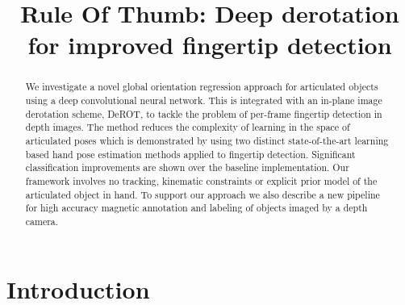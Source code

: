 \documentclass{bmvc2k}
\title{Rule Of Thumb: Deep derotation for improved fingertip detection}
\begin{document}
\maketitle


\begin{abstract}
We investigate a novel global orientation regression approach for articulated 
 objects using a deep convolutional neural network. This is integrated with an in-plane image derotation scheme, DeROT, to tackle the problem of per-frame fingertip detection in depth images. The method reduces the complexity of learning in the space of articulated poses which is demonstrated by using two distinct state-of-the-art learning based hand pose estimation methods applied to fingertip detection. Significant classification improvements are shown over the baseline implementation. Our framework involves no tracking, kinematic constraints or explicit prior model of the articulated object in hand. To support our approach we also describe a new pipeline for high accuracy magnetic annotation and labeling of objects imaged by a depth camera. 
  
\end{abstract}




\section{Introduction} \label{sec:intro}
\end{document}
